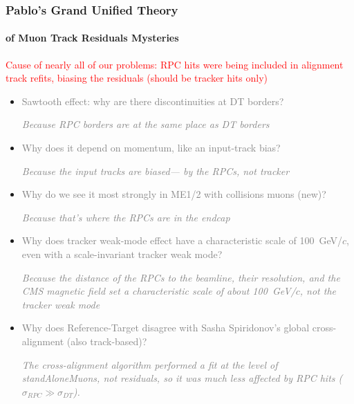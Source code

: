 \documentclass[compress]{beamer}
\begin{document}
\begin{frame}
\frametitle{Pablo's Grand Unified Theory}
\framesubtitle{of Muon Track Residuals Mysteries}
\textcolor{red}{Cause of nearly all of our problems: RPC hits were being included in alignment track refits, biasing the residuals (should be tracker hits only)}

\scriptsize
\begin{itemize}\setlength{\itemsep}{0.1 cm}
\item \textcolor{gray}{Sawtooth effect: why are there discontinuities at DT borders?}

\textcolor{gray}{\it Because RPC borders are at the same place as DT borders}

\item \textcolor{gray}{Why does it depend on momentum, like an input-track bias?}

\textcolor{gray}{\it Because the input tracks are biased--- by the RPCs, not tracker}

\item \textcolor{gray}{Why do we see it most strongly in ME1/2 with collisions muons (new)?}

\textcolor{gray}{\it Because that's where the RPCs are in the endcap}

\item \textcolor{gray}{Why does tracker weak-mode effect have a characteristic scale of
  100~GeV/$c$, even with a scale-invariant tracker weak mode?}

\textcolor{gray}{\it Because the distance of the RPCs to the beamline, their
  resolution, and the CMS magnetic field set a characteristic scale of
  about 100~GeV/$c$, not the tracker weak mode}

\item \textcolor{gray}{Why does Reference-Target disagree with Sasha Spiridonov's global
  cross-alignment (also track-based)?}

\textcolor{gray}{\it The cross-alignment algorithm performed a fit
  at the level of standAloneMuons, not residuals, so it was much less
  affected by RPC hits ($\sigma_{RPC} \gg \sigma_{DT}$).}
\end{itemize}
\end{frame}
\end{document}
